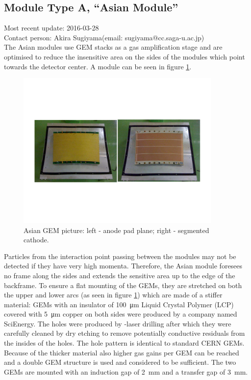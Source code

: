 \subsection{Module Type A, ``Asian Module''}
\label{chap:TPC_sec:asian_gems}
Most recent update: 2016-03-28\\
Contact person: Akira Sugiyama(email: sugiyama@cc.saga-u.ac.jp)\\

The Asian modules use GEM stacks as a gas amplification stage and are optimised to reduce the insensitive area
on the sides of the modules which point towards the detector center.
A module can be seen in figure \ref{fig_Fig1asiangempicture}.

\begin{figure}[!htb]
  \centering
  \includegraphics[width=0.9\textwidth]{Tracker/TPC_Bonn/plots/TPC-AG_Fig1asaingempicture.pdf}
  \caption{Asian GEM picture: left - anode pad plane; right - segmented cathode.}
  \label{fig_Fig1asiangempicture}
\end{figure}

Particles from the interaction point passing
between the modules may not be detected if they have very high momenta. Therefore, the Asian module foresees no frame along
the sides and extends the sensitive
area up to the edge of the backframe. To ensure a flat mounting of the GEMs, they are stretched on both the upper
and lower arcs (as seen in figure \ref{fig_Fig1asiangempicture}) which are made of a stiffer material:
GEMs with an insulator of \SI{100}{\micro\meter} Liquid Crystal Polymer (LCP)
covered with \SI{5}{\micro\meter} copper on both sides were produced by a company named SciEnergy.
The holes were
produced by -laser drilling after which they were carefully cleaned by dry etching to remove potentially
conductive residuals from the insides of the holes. The
hole pattern is identical to standard CERN GEMs. Because of the thicker material also higher gas gains per GEM
can be reached and a double GEM
structure is used and considered to be sufficient.
The two GEMs are mounted with an induction gap of \SI{2}{mm} and a transfer gap of \SI{3}{mm}.

